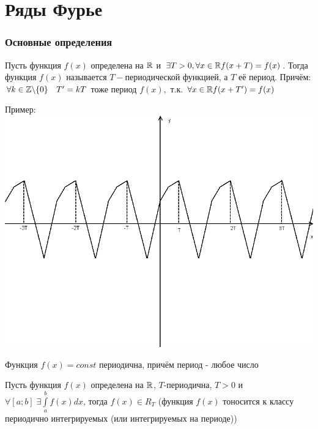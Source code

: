 \part{Ряды Фурье}
\section{Основные определения}

\begin{Def}
	Пусть функция $f(x)$ определена на $\mathbb{R}$ и $\exists T > 0, \;\\
	\forall x \in \mathbb{R} f(x+T) = f(x)$. Тогда функция $f(x)$ называется $T-$периодической функцией, а $T$ \textendash её период. Причём:\\
	$\forall k \in \mathbb{Z} \backslash \{0\} \quad T' = kT$ тоже период $f(x),$ т.к. $\forall x \in \mathbb{R} f(x+T') = f(x)$
\end{Def}

Пример:\\
\includegraphics[width=1.0\textwidth]{pictures/5_1.png}

\begin{Note}
	Функция $f(x) = const$ периодична, причём период - любое число
\end{Note}

\begin{Def}
	Пусть функция $f(x)$ определена на $\mathbb{R}$, $T$-периодична, $T > 0$ и $\forall [a;b] \; \exists \int\limits_{a}^{b}f(x)dx$, тогда $f(x) \in R_T$ (функция $f(x)$ тоносится к классу периодично интегрируемых (или интегрируемых на периоде))%
\end{Def}

